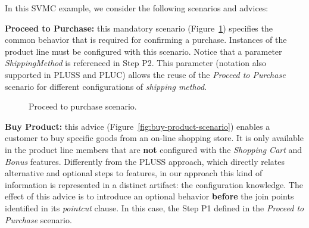 \documentclass{acm_proc_article-sp}
\begin{document}
In this SVMC example, we consider the following scenarios and advices:

{\bf Proceed to Purchase:} this mandatory scenario
(Figure~\ref{fig:proceed-to-checkout}) specifies the common behavior that is
required for confirming a purchase. Instances of the product line must be
configured with this scenario. Notice that a parameter
\emph{ShippingMethod} is referenced in Step P2. This parameter (notation
also supported in PLUSS and PLUC) allows the reuse of the \emph{Proceed to
Purchase} scenario for different configurations of \emph{shipping method}. 

\begin{figure}[h]
\caption{Proceed to purchase scenario.}
\label{fig:proceed-to-checkout}
\end{figure}

{\bf Buy Product:} this advice (Figure~\ref{fig:buy-product-scenario}) enables a
customer to buy specific goods from an on-line shopping store. It is only
available in the product line members that are {\bf not} configured with the
\emph{Shopping Cart} and \emph{Bonus} features. Differently from the PLUSS
approach, which directly relates alternative and optional steps to features, in
our approach this kind of information is represented in a distinct artifact: the
configuration knowledge. The effect of this advice is to introduce an optional behavior {\bf
before} the join points identified in its \emph{pointcut} clause. In this case,
the Step P1 defined in the \emph{Proceed to Purchase} scenario.
\end{document}
